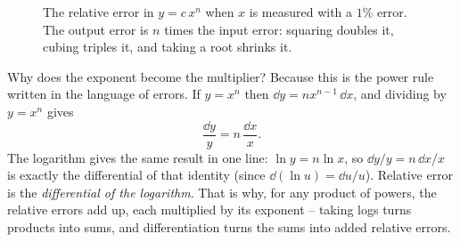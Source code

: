 \begin{figure}[htbp]
\centering
{}
\caption{The relative error in $y=c\,x^n$ when $x$ is measured with a $1\%$ error.
The output error is $n$ times the input error: squaring doubles it, cubing triples
it, and taking a root shrinks it.}
\label{ch14:fig-powerlaw}
\end{figure}

\begin{whybox}
Why does the exponent become the multiplier? Because this is the
power rule written in the language of errors. If $y = x^n$ then $\dd y = n x^{n-1}\,\dd x$,
and dividing by $y=x^n$ gives
\[
\frac{\dd y}{y} = n\,\frac{\dd x}{x}.
\]
The logarithm gives the same result in one line: $\ln y = n\ln x$, so
$\dd y/y = n\,\dd x/x$ is exactly the differential of that identity (since
$\dd(\ln u) = \dd u/u$). Relative error is the \emph{differential of the
logarithm}. That is why, for any product of powers, the relative errors
add up, each multiplied by its exponent -- taking logs turns products into sums,
and differentiation turns the sums into added relative errors.
\end{whybox}

